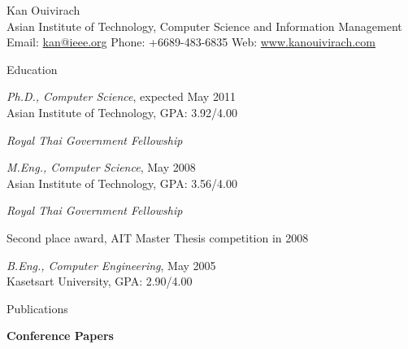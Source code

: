\documentclass[10pt]{article}
\newenvironment{subbulletlist}{%
	\begin{list}{\labelitemii}{%
		\setlength{\topsep}{\itemsep}\setlength{\parskip}{\parsep}%
	}%
}%
{ \end{list} }
\begin{document}
\newlength{\oldcvlabelwidth}
\newlength{\oldcvlabelsep}

\begin{cv}{{\large Kan Ouivirach}\\
{\normalsize Asian Institute of Technology, Computer Science and Information Management\\
Email: {\mdseries \href{mailto:kan@ieee.org}
	{kan@ieee.org}} 
\hfill Phone: {\mdseries +6689-483-6835} \hfill 
Web: {\mdseries \href{http://www.kanouivirach.com/}
	{www.kanouivirach.com}}}
}

\setlength{\oldcvlabelwidth}{\cvlabelwidth}
\setlength{\oldcvlabelsep}{\cvlabelsep}

\setlength{\cvlabelwidth}{1em}

\begin{cvlist}{Education}
	\item \emph{Ph.D., Computer Science}, expected May 2011\\
	Asian Institute of Technology, GPA: 3.92/4.00
	\begin{subbulletlist}
		\item \emph{Royal Thai Government Fellowship} 
	\end{subbulletlist}
	
	\item \emph{M.Eng., Computer Science}, May 2008\\ 
	Asian Institute of Technology, GPA: 3.56/4.00
	\begin{subbulletlist}
		\item \emph{Royal Thai Government Fellowship} 
		\item Second place award, AIT Master Thesis competition in 2008
	\end{subbulletlist}
	
	\item \emph{B.Eng., Computer Engineering}, May 2005\\
	Kasetsart University, GPA: 2.90/4.00
\end{cvlist}

\setlength{\cvlabelwidth}{0em}
\setlength{\cvlabelsep}{\labelsep}
\begin{cvlist}{Publications}
	\item \textbf{Conference Papers}
  
\end{cvlist}


\end{cv}
\end{document}
